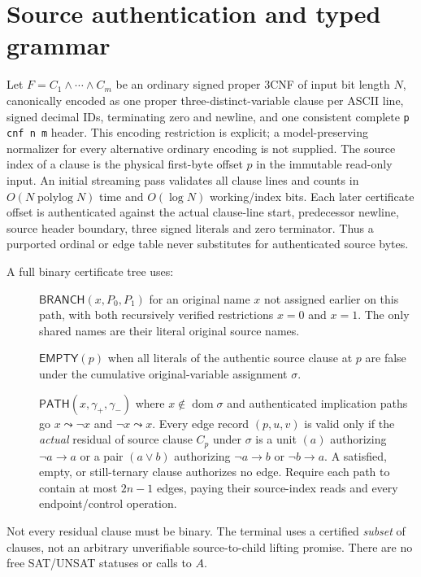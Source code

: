 \documentclass[11pt]{article}
\begin{document}
\section{Source authentication and typed grammar}
Let $F=C_1\wedge\cdots\wedge C_m$ be an ordinary signed proper 3CNF of input bit length $N$, canonically encoded as one proper three-distinct-variable clause per ASCII line, signed decimal IDs, terminating zero and newline, and one consistent complete \texttt{p cnf n m} header. This encoding restriction is explicit; a model-preserving normalizer for every alternative ordinary encoding is not supplied. The source index of a clause is the physical first-byte offset $p$ in the immutable read-only input. An initial streaming pass validates all clause lines and counts in $O(N\operatorname{polylog}N)$ time and $O(\log N)$ working/index bits. Each later certificate offset is authenticated against the actual clause-line start, predecessor newline, source header boundary, three signed literals and zero terminator. Thus a purported ordinal or edge table never substitutes for authenticated source bytes.

A full binary certificate tree uses:
\begin{description}
\item[] $\mathsf{BRANCH}(x,P_0,P_1)$ for an original name $x$ not assigned earlier on this path, with both recursively verified restrictions $x=0$ and $x=1$. The only shared names are their literal original source names.
\item[] $\mathsf{EMPTY}(p)$ when all literals of the authentic source clause at $p$ are false under the cumulative original-variable assignment $\sigma$.
\item[] $\mathsf{PATH}(x,\gamma_+,\gamma_-)$ where $x\notin\operatorname{dom}\sigma$ and authenticated implication paths go $x\leadsto\neg x$ and $\neg x\leadsto x$. Every edge record $(p,u,v)$ is valid only if the \emph{actual} residual of source clause $C_p$ under $\sigma$ is a unit $(a)$ authorizing $\neg a\to a$ or a pair $(a\vee b)$ authorizing $\neg a\to b$ or $\neg b\to a$. A satisfied, empty, or still-ternary clause authorizes no edge. Require each path to contain at most $2n-1$ edges, paying their source-index reads and every endpoint/control operation.
\end{description}
Not every residual clause must be binary. The terminal uses a certified \emph{subset} of clauses, not an arbitrary unverifiable source-to-child lifting promise. There are no free SAT/UNSAT statuses or calls to $A$.
\end{document}
